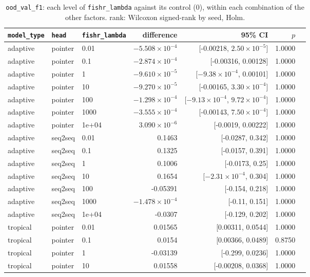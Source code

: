 \documentclass[10pt]{article}
\begin{document}
{\small
\begin{longtable}{lllrrrl}
\caption{\texttt{ood\_val\_f1}: each level of \texttt{fishr\_lambda} against its control (0), within each combination of the other factors. rank: Wilcoxon signed-rank by seed, Holm.}\label{tab:control-ood_val_f1}\\
\toprule
\texttt{model\_type} & \texttt{head} & \texttt{fishr\_lambda} & difference & 95\% CI & $p$ & \\
\midrule
\endhead
adaptive & pointer & 0.01 & $-5.508\times10^{-4}$ & [-0.00218, $2.50\times10^{-5}$] & 1.0000 & \\
adaptive & pointer & 0.1 & $-2.874\times10^{-4}$ & [-0.00316, 0.00128] & 1.0000 & \\
adaptive & pointer & 1 & $-9.610\times10^{-5}$ & [$-9.38\times10^{-4}$, 0.00101] & 1.0000 & \\
adaptive & pointer & 10 & $-9.270\times10^{-5}$ & [-0.00165, $3.30\times10^{-4}$] & 1.0000 & \\
adaptive & pointer & 100 & $-1.298\times10^{-4}$ & [$-9.13\times10^{-4}$, $9.72\times10^{-4}$] & 1.0000 & \\
adaptive & pointer & 1000 & $-3.555\times10^{-4}$ & [-0.00143, $7.50\times10^{-4}$] & 1.0000 & \\
adaptive & pointer & 1e+04 & $3.090\times10^{-6}$ & [-0.0019, 0.00222] & 1.0000 & \\
adaptive & seq2seq & 0.01 & 0.1463 & [-0.0287, 0.342] & 1.0000 & \\
adaptive & seq2seq & 0.1 & 0.1325 & [-0.0157, 0.391] & 1.0000 & \\
adaptive & seq2seq & 1 & 0.1006 & [-0.0173, 0.25] & 1.0000 & \\
adaptive & seq2seq & 10 & 0.1654 & [$-2.31\times10^{-4}$, 0.304] & 1.0000 & \\
adaptive & seq2seq & 100 & -0.05391 & [-0.154, 0.218] & 1.0000 & \\
adaptive & seq2seq & 1000 & $-1.478\times10^{-4}$ & [-0.11, 0.151] & 1.0000 & \\
adaptive & seq2seq & 1e+04 & -0.0307 & [-0.129, 0.202] & 1.0000 & \\
tropical & pointer & 0.01 & 0.01565 & [0.00311, 0.0544] & 1.0000 & \\
tropical & pointer & 0.1 & 0.0154 & [0.00366, 0.0489] & 0.8750 & \\
tropical & pointer & 1 & -0.03139 & [-0.299, 0.0236] & 1.0000 & \\
tropical & pointer & 10 & 0.01558 & [-0.00208, 0.0368] & 1.0000 & \\

\end{longtable}}
\end{document}
